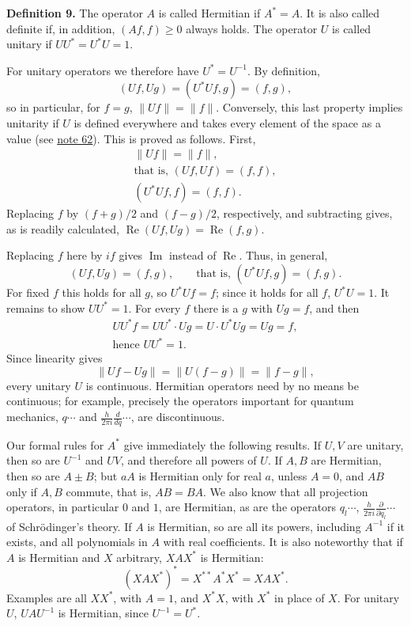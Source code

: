 \documentclass[fontsize=13pt,twoside,openany,headings=normal,parskip=false,bookmarkpackage=false,DIV=calc]{scrbook}
\begin{document}
\leavevmode{}\textbf{Definition 9.}\label{def:II.9} The operator $A$ is called Hermitian if $A^*=A$. It is also called definite if, in addition, $(Af,f)\geq0$ always holds. The operator $U$ is called unitary if $UU^*=U^*U=1$.

For unitary operators we therefore have $U^*=U^{-1}$. By definition,
\[
(Uf,Ug)=(U^*Uf,g)=(f,g),
\]
so in particular, for $f=g$, $\|Uf\|=\|f\|$. Conversely, this last property implies unitarity if $U$ is defined everywhere and takes every element of the space as a value (see \hyperlink{note-62}{note 62}). This is proved as follows. First,
\begin{gather*}
\|Uf\|=\|f\|,\\
\text{that is, }(Uf,Uf)=(f,f),\\
(U^*Uf,f)=(f,f).
\end{gather*}
Replacing $f$ by $(f+g)/2$ and $(f-g)/2$, respectively, and subtracting gives, as is readily calculated, $\operatorname{Re}(Uf,Ug)=\operatorname{Re}(f,g)$.

\hypertarget{origpage-51}{}%
Replacing $f$ here by $if$ gives $\operatorname{Im}$ instead of $\operatorname{Re}$. Thus, in general,
\[
(Uf,Ug)=(f,g),\qquad\text{that is, }(U^*Uf,g)=(f,g).
\]
For fixed $f$ this holds for all $g$, so $U^*Uf=f$; since it holds for all $f$, $U^*U=1$. It remains to show $UU^*=1$. For every $f$ there is a $g$ with $Ug=f$, and then
\begin{gather*}
UU^*f=UU^*\cdot Ug=U\cdot U^*Ug=Ug=f,\\
\text{hence }UU^*=1.
\end{gather*}
Since linearity gives
\[
\|Uf-Ug\|=\|U(f-g)\|=\|f-g\|,
\]
every unitary $U$ is continuous. Hermitian operators need by no means be continuous; for example, precisely the operators important for quantum mechanics, $q\cdots$ and $\frac{h}{2\pi i}\frac{d}{dq}\cdots$, are discontinuous.

Our formal rules for $A^*$ give immediately the following results. If $U,V$ are unitary, then so are $U^{-1}$ and $UV$, and therefore all powers of $U$. If $A,B$ are Hermitian, then so are $A\pm B$; but $aA$ is Hermitian only for real $a$, unless $A=0$, and $AB$ only if $A,B$ commute, that is, $AB=BA$. We also know that all projection operators, in particular $0$ and $1$, are Hermitian, as are the operators $q_l\cdots$, $\frac{h}{2\pi i}\frac{\partial}{\partial q_l}\cdots$ of Schr\"odinger's theory. If $A$ is Hermitian, so are all its powers, including $A^{-1}$ if it exists, and all polynomials in $A$ with real coefficients. It is also noteworthy that if $A$ is Hermitian and $X$ arbitrary, $XAX^*$ is Hermitian:
\[
(XAX^*)^*=X^{**}A^*X^*=XAX^*.
\]
Examples are all $XX^*$, with $A=1$, and $X^*X$, with $X^*$ in place of $X$. For unitary $U$, $UAU^{-1}$ is Hermitian, since $U^{-1}=U^*$.
\end{document}
